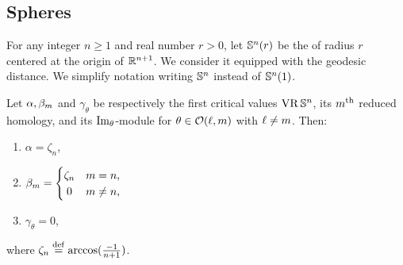 
\subsection{Spheres}\label{ss:Sn}\label{subsub:critical values of Sn}

For any integer $n \geq 1$ and real number $r > 0$, let $\mathbb{S}^n(r)$ be the  of radius $r$ centered at the origin of $\mathbb{R}^{n+1}$.
We consider it equipped with the geodesic distance.
We simplify notation writing \(\mathbb{S}^n\) instead of \(\mathbb{S}^n(1)\).


\medskip\proposition
Let $\alpha, \beta_m$ and $\gamma_\theta$ be respectively the first critical values $\operatorname{VR}\mathbb{S}^n$, its $m^{\mathrm{th}}$ reduced homology, and its $\operatorname{Im}_\theta$-module for \(\theta \in \mathcal{O}(\ell,m)\) with \(\ell \neq m\).
Then:
\begin{enumerate}
	\item $\alpha = \zeta_n$,
	\item \(\beta_m =
	\begin{cases}
		\zeta_n & m = n, \\
		\hfil 0 & m \neq n,
	\end{cases}\)
	\item $\gamma_\theta = 0$,
\end{enumerate}
where \(\zeta_n \stackrel{\mathrm{def}}{=} \arccos(\tfrac{-1}{n+1})\).

